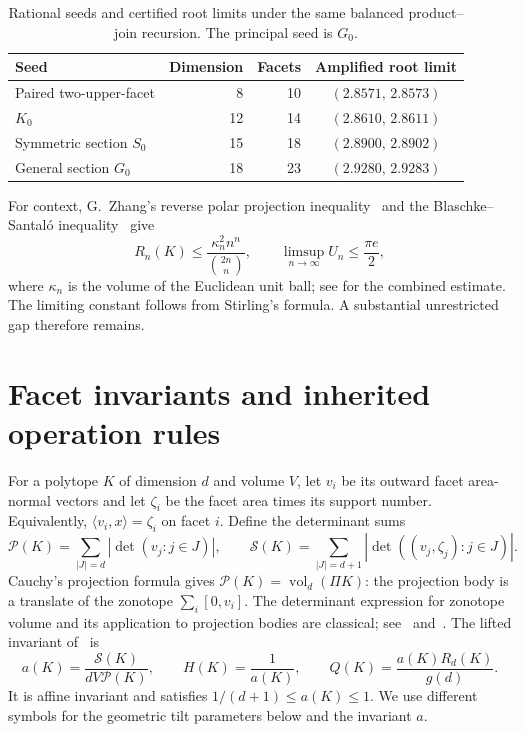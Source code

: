 \documentclass[11pt]{article}
\DeclareMathOperator{\vol}{vol}
\newcommand{\RK}{\mathcal P}
\begin{document}
\begin{table}[htbp]
\centering
\caption{Rational seeds and certified root limits under the same balanced
product--join recursion. The principal seed is $G_0$.}
\label{tab:seeds}
\begin{tabular}{lrrc}
\toprule
Seed & Dimension & Facets & Amplified root limit\\
\midrule
Paired two-upper-facet & 8 & 10 & $(2.8571,\,2.8573)$\\
$K_0$ & 12 & 14 & $(2.8610,\,2.8611)$\\
Symmetric section $S_0$ & 15 & 18 & $(2.8900,\,2.8902)$\\
General section $G_0$ & 18 & 23 & $(2.9280,\,2.9283)$\\
\bottomrule
\end{tabular}
\end{table}

For context, G.~Zhang's reverse polar projection inequality~\cite{zhang}
and the Blaschke--Santal\'o inequality~\cite{meyer-pajor} give
\[
 R_n(K)\le\frac{\kappa_n^2 n^n}{\binom{2n}{n}},\qquad
 \limsup_{n\to\infty}U_n\le\frac{\pi e}{2},
\]
where $\kappa_n$ is the volume of the Euclidean unit ball; see
\cite[Introduction, equation (3)]{saroglou} for the combined estimate.
The limiting constant follows
from Stirling's formula. A substantial unrestricted gap therefore remains.

\section{Facet invariants and inherited operation rules}
For a polytope $K$ of dimension $d$ and volume $V$, let $v_i$ be its
outward facet area-normal vectors and let $\zeta_i$ be the facet area times
its support number. Equivalently, $\langle v_i,x\rangle=\zeta_i$ on facet $i$.
Define the determinant sums
\[
 \RK(K)=\sum_{|J|=d}|\det(v_j:j\in J)|,\qquad
 \mathcal S(K)=\sum_{|J|=d+1}|\det((v_j,\zeta_j):j\in J)|.
\]
Cauchy's projection formula gives $\RK(K)=\vol_d(\Pi K)$: the projection
body is a translate of the zonotope $\sum_i[0,v_i]$.
The determinant expression for zonotope volume and its application to
projection bodies are classical; see~\cite[Section 1]{lyz}
and~\cite[Section 3]{saroglou}.
The lifted invariant of~\cite[Section 2]{mxym-calculus} is
\begin{equation}\label{eq:invariant}
 a(K)=\frac{\mathcal S(K)}{dV\RK(K)},\qquad
 H(K)=\frac1{a(K)},\qquad Q(K)=\frac{a(K)R_d(K)}{g(d)}.
\end{equation}
It is affine invariant and satisfies $1/(d+1)\le a(K)\le1$.
We use different symbols for the geometric tilt parameters below and
the invariant $a$.
\end{document}
